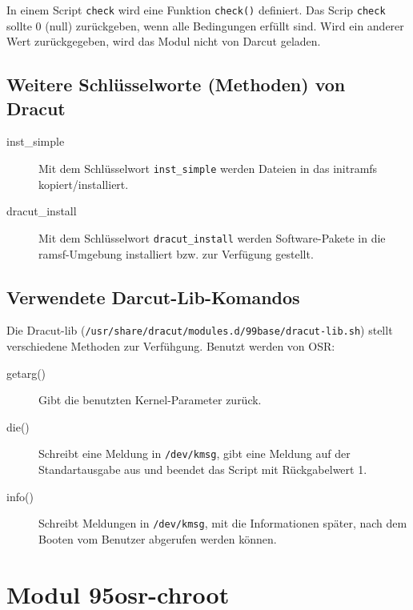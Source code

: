 \documentclass[10pt,a4paper]{article}
\begin{document}
In einem Script \texttt{check} wird eine Funktion \texttt{check()} definiert. Das Scrip \texttt{check} sollte 0 (null) zurückgeben, wenn alle Bedingungen erfüllt sind. Wird ein anderer Wert zurückgegeben, wird das Modul nicht von Darcut geladen.

\subsection{Weitere Schlüsselworte (Methoden) von Dracut}

\begin{description}
 \item[inst\_simple] Mit dem Schlüsselwort \texttt{inst\_simple} werden Dateien in das initramfs kopiert/installiert.
 \item[dracut\_install] Mit dem Schlüsselwort \texttt{dracut\_install} werden Software-Pakete in die ramsf-Umgebung installiert bzw. zur Verfügung gestellt.
 \end{description}
 
\subsection{Verwendete Darcut-Lib-Komandos}

Die Dracut-lib (\texttt{/usr/share/dracut/modules.d/99base/dracut-lib.sh}) stellt verschiedene Methoden zur Verfühgung. Benutzt werden von OSR:

\begin{description}
 \item [getarg()] Gibt die benutzten Kernel-Parameter zurück.
 \item [die()] Schreibt eine Meldung in \texttt{/dev/kmsg}, gibt eine Meldung auf der Standartausgabe aus und beendet das Script mit Rückgabelwert 1.
 \item [info()] Schreibt Meldungen in  \texttt{/dev/kmsg}, mit die Informationen später, nach dem Booten vom Benutzer abgerufen werden können.

\end{description}



\section{Modul 95osr-chroot}
\end{document}
